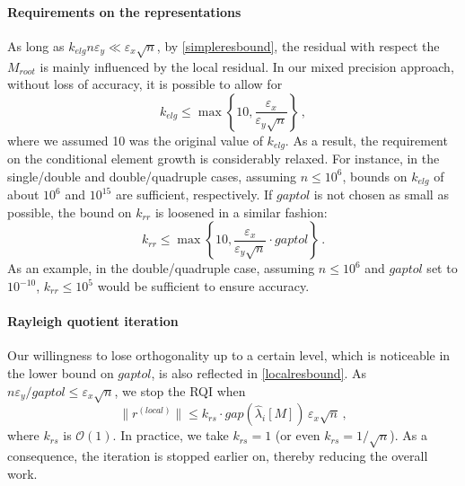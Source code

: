 \documentclass[final]{siamltex}
\newcommand\norm[1]{\lVert#1\rVert}
\newcommand\order[1]{\mathcal{O}(#1)}
\begin{document}
\paragraph{Requirements on the representations}
As long as $k_{elg} n\varepsilon_y \ll \varepsilon_x \sqrt{n}$, by \eqref{simpleresbound},
the residual with respect the $M_{root}$ is mainly influenced by the local
residual. In our mixed precision approach, without loss of accuracy, it
is possible to allow for  
\begin{equation}
k_{elg}\leq \max \left\{10, \frac{\varepsilon_x}{\varepsilon_y \sqrt{n}}
\right\} \,,
\label{eq:newkelgbound}
\end{equation}
where we assumed 10 was the original value of $k_{elg}$. As a result, the
requirement on the conditional element growth is considerably relaxed. 
For instance, in the single/double and double/quadruple cases,
assuming $n \leq 10^6$, bounds on $k_{elg}$ of about $10^6$ and $10^{15}$ are
sufficient, respectively. 
If $gaptol$ is
not chosen as small as possible, the bound on $k_{rr}$ is loosened in a
similar fashion:
\begin{equation}
k_{rr}\leq \max \left\{10, \frac{\varepsilon_x}{\varepsilon_y
    \sqrt{n}} \cdot gaptol \right\} \,.
\label{eq:newkrrbound}
\end{equation}
As an example, in the double/quadruple case, assuming $n \leq 10^6$ and
$gaptol$ set to $10^{-10}$, $k_{rr} \leq 10^5$ would be sufficient to ensure
accuracy. 

\paragraph{Rayleigh quotient iteration}
Our willingness to lose orthogonality up to a certain level, which is
noticeable in the lower bound on $gaptol$, 
is also reflected in \eqref{localresbound}. 
As $n \varepsilon_y / gaptol \leq \varepsilon_x 
 \sqrt{n}$, we stop the RQI when
\begin{equation}
\norm{r^{(local)}} \leq k_{rs}  \cdot
gap\left(\hat{\lambda}_i[M]\right) \, \varepsilon_x \sqrt{n} \,,
\end{equation}
where $k_{rs}$ is $\order{1}$. In practice, we take $k_{rs} = 1$ (or
even $k_{rs} = 1/\sqrt{n}$). As a consequence, the iteration is stopped
earlier on, thereby reducing the overall work. 
\end{document}
